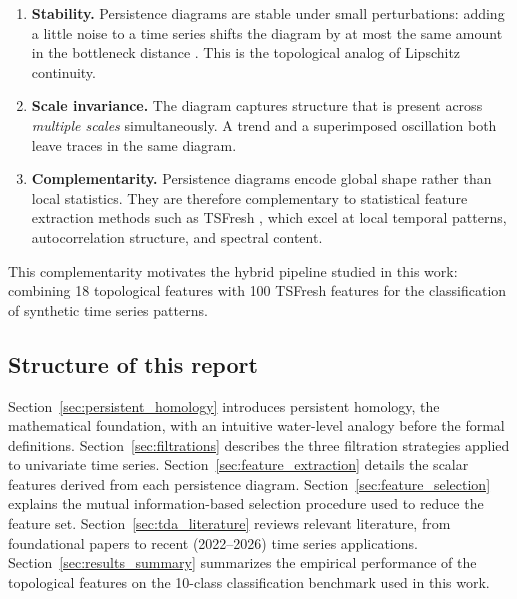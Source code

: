 \documentclass[12pt, a4paper]{article}
\theoremstyle{definition}
\theoremstyle{plain}
\begin{document}
\begin{enumerate}[nosep]
  \item \textbf{Stability.} Persistence diagrams are stable under small
    perturbations: adding a little noise to a time series shifts the diagram by
    at most the same amount in the bottleneck distance
    \citep{cohen-steiner2007stability}. This is the topological analog of
    Lipschitz continuity.

  \item \textbf{Scale invariance.} The diagram captures structure that is present
    across \emph{multiple scales} simultaneously. A trend and a superimposed
    oscillation both leave traces in the same diagram.

  \item \textbf{Complementarity.} Persistence diagrams encode global shape rather
    than local statistics. They are therefore complementary to statistical feature
    extraction methods such as TSFresh \citep{christ2018time}, which excel at
    local temporal patterns, autocorrelation structure, and spectral content.
\end{enumerate}

This complementarity motivates the hybrid pipeline studied in this work: combining
18 topological features with 100 TSFresh features for the classification of
synthetic time series patterns.

\subsection*{Structure of this report}

\bigskip
\noindent
Section~\ref{sec:persistent_homology} introduces persistent homology, the
mathematical foundation, with an intuitive water-level analogy before the formal
definitions.
Section~\ref{sec:filtrations} describes the three filtration strategies applied to
univariate time series.
Section~\ref{sec:feature_extraction} details the scalar features derived from each
persistence diagram.
Section~\ref{sec:feature_selection} explains the mutual information-based selection
procedure used to reduce the feature set.
Section~\ref{sec:tda_literature} reviews relevant literature, from foundational
papers to recent (2022--2026) time series applications.
Section~\ref{sec:results_summary} summarizes the empirical performance of the
topological features on the 10-class classification benchmark used in this work.

\end{document}

